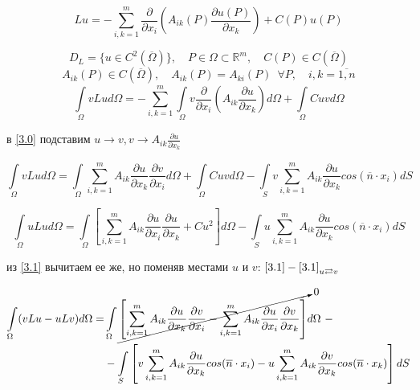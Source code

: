 \[ Lu = - \sum_{i,k =1}^{m } \frac{\partial }{\partial x_i} \left(A_{ik} (P) \frac{ \partial u(P)}{\partial x_k}\right) + C(P) u(P) \]

\[ D_L = \{ u \in C^2(\overline{\Omega}) \}, \quad P \in \Omega \subset \mathbb{R}^m, \quad C(P) \in C(\overline{\Omega}) \]
\[ A_{ik}(P) \in C(\overline{\Omega}), \quad A_{ik}(P) = A_{ki}(P) \enspace \forall P, \quad i,k=\overline{1,n} \]
\[ \int\limits_{\Omega} v Lu d \Omega = - \sum_{i,k =1}^{m }  \int\limits_{\Omega} v \frac{\partial }{\partial x_i} \left(A_{ik} \frac{ \partial u}{\partial x_k}\right) d \Omega + \int\limits_{\Omega}^{}C u v d \Omega  \]

в \eqref{3.0} подставим $ u \rightarrow v, v \rightarrow A_{ik} \frac{\partial u }{\partial x_k }$

\begin{equation}
	\label{3.1}
	\tag{3.1}
	\int\limits_{\Omega}^{} v L u d\Omega = \int\limits_{\Omega}^{} \sum_{i,k = 1}^{m}A_{ik} \frac{\partial u }{\partial x_k} \frac{\partial v }{\partial x_i} d\Omega + \int\limits_{\Omega} C u vd\Omega - \int\limits_{S }^{} v \sum_{i,k=1}^{m} A_{ik} \frac{\partial u}{\partial x_k } cos(\overline{n} \cdot x_i ) dS
\end{equation}

\begin{equation}
	\label{3.2}
	\tag{3.2}
	\int\limits_{\Omega}^{} u L u d\Omega = \int\limits_{\Omega} \left[ \sum_{i,k = 1}^{m}A_{ik} \frac{\partial u }{\partial x_i} \frac{\partial u }{\partial x_k} + Cu^2 \right] d\Omega - \int\limits_{S } u \sum_{i,k =1}^{m} A_{ik} \frac{\partial u}{\partial x_k } cos(\overline{n} \cdot x_i ) dS
\end{equation}

из \eqref{3.1} вычитаем ее же, но поменяв местами $u$ и $v$: \qquad $ \eqref{3.1} - \eqref{3.1}_{u \rightleftarrows v} $

\begin{equation*}
	\begin{split}
		\int\limits_{\Omega }^{} (vLu - uLv) d\Omega = & \int\limits_{\Omega} \cancelto{0}{\left[ \sum_{i,k = 1}^{m}A_{ik} \frac{\partial u }{\partial x_k} \frac{\partial v }{\partial x_i} - \sum_{i,k = 1}^{m}A_{ik} \frac{\partial u }{\partial x_i} \frac{\partial v }{\partial x_k} \right]} d\Omega \ - \\
		& - \int\limits_{S} \left[ v \sum_{i,k =1}^{m} A_{ik} \frac{\partial u}{\partial x_k } cos(\overline{n} \cdot x_i ) - u \sum_{i,k =1}^{m} A_{ik} \frac{\partial v}{\partial x_k } cos(\overline{n} \cdot x_k )\right] dS
	\end{split}
\end{equation*}

